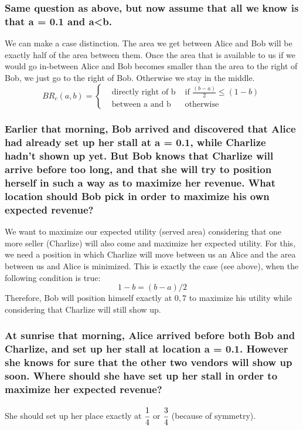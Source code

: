 \documentclass[11pt]{article}
\begin{document}
    \subsubsection{Same question as above, but now assume that all we know is that a = 0.1 and a<b.}
    We can make a case distinction. The area we get between Alice and Bob will be exactly half of the area between them.
    Once the area that is available to us if we would go in-between Alice and Bob becomes smaller than the area to the right of
    Bob, we just go to the right of Bob. Otherwise we stay in the middle.
    \begin{equation}
        BR_c(a,b)=\left\{
        \begin{array}{lll}
            & \text{directly right of b } & \mbox{if } \frac{(b-a)}{2}\leq(1-b) \\
            & \mbox{between a and b}      & \text{otherwise}
        \end{array}
        \right.
    \end{equation}

    \subsubsection{Earlier that morning, Bob arrived and discovered that Alice had already set up her stall at a = 0.1, while Charlize hadn’t shown up yet. But Bob knows that Charlize will arrive before too long, and that she will try to position herself in such a way as to maximize her revenue. What location should Bob pick in order to maximize his own expected revenue?}
    We want to maximize our expected utility (served area) considering that one more seller (Charlize) will also come and maximize
    her expected utility. For this, we need a position in which Charlize will move between us an Alice and the area between us and
    Alice is minimized. This is exactly the case (see above), when the following condition is true:
    \begin{equation}
        1-b = (b-a)/2
    \end{equation}
    Therefore, Bob will position himself exactly at $0,7$ to maximize his utility while considering that Charlize will still show up.

    \subsubsection{At sunrise that morning, Alice arrived before both Bob and Charlize, and set up her stall at location a = 0.1. However she knows for sure that the other two vendors will show up soon. Where should she have set up her stall in order to maximize her expected revenue?}
    She should set up her place exactly at $\cfrac{1}{4}$ or $\cfrac{3}{4}$ (because of symmetry).
\end{document}
